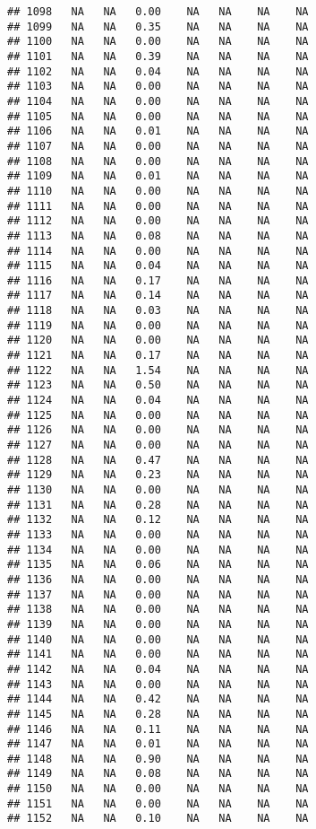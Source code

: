 \documentclass{article}\usepackage{graphicx, color}
\makeatletter
\newenvironment{kframe}{%
 \def\at@end@of@kframe{}%
 \ifinner\ifhmode%
  \def\at@end@of@kframe{\end{minipage}}%
  \begin{minipage}{\columnwidth}%
 \fi\fi%
 \def\FrameCommand##1{\hskip\@totalleftmargin \hskip-\fboxsep
 \colorbox{shadecolor}{##1}\hskip-\fboxsep
     \hskip-\linewidth \hskip-\@totalleftmargin \hskip\columnwidth}%
 \MakeFramed {\advance\hsize-\width
   \@totalleftmargin\z@ \linewidth\hsize
   \@setminipage}}%
 {\par\unskip\endMakeFramed%
 \at@end@of@kframe}
\newenvironment{knitrout}{}{} %
\makeatother
\begin{document}
\begin{knitrout}
\begin{kframe}
\begin{verbatim}
## 1098   NA   NA   0.00    NA   NA    NA    NA
## 1099   NA   NA   0.35    NA   NA    NA    NA
## 1100   NA   NA   0.00    NA   NA    NA    NA
## 1101   NA   NA   0.39    NA   NA    NA    NA
## 1102   NA   NA   0.04    NA   NA    NA    NA
## 1103   NA   NA   0.00    NA   NA    NA    NA
## 1104   NA   NA   0.00    NA   NA    NA    NA
## 1105   NA   NA   0.00    NA   NA    NA    NA
## 1106   NA   NA   0.01    NA   NA    NA    NA
## 1107   NA   NA   0.00    NA   NA    NA    NA
## 1108   NA   NA   0.00    NA   NA    NA    NA
## 1109   NA   NA   0.01    NA   NA    NA    NA
## 1110   NA   NA   0.00    NA   NA    NA    NA
## 1111   NA   NA   0.00    NA   NA    NA    NA
## 1112   NA   NA   0.00    NA   NA    NA    NA
## 1113   NA   NA   0.08    NA   NA    NA    NA
## 1114   NA   NA   0.00    NA   NA    NA    NA
## 1115   NA   NA   0.04    NA   NA    NA    NA
## 1116   NA   NA   0.17    NA   NA    NA    NA
## 1117   NA   NA   0.14    NA   NA    NA    NA
## 1118   NA   NA   0.03    NA   NA    NA    NA
## 1119   NA   NA   0.00    NA   NA    NA    NA
## 1120   NA   NA   0.00    NA   NA    NA    NA
## 1121   NA   NA   0.17    NA   NA    NA    NA
## 1122   NA   NA   1.54    NA   NA    NA    NA
## 1123   NA   NA   0.50    NA   NA    NA    NA
## 1124   NA   NA   0.04    NA   NA    NA    NA
## 1125   NA   NA   0.00    NA   NA    NA    NA
## 1126   NA   NA   0.00    NA   NA    NA    NA
## 1127   NA   NA   0.00    NA   NA    NA    NA
## 1128   NA   NA   0.47    NA   NA    NA    NA
## 1129   NA   NA   0.23    NA   NA    NA    NA
## 1130   NA   NA   0.00    NA   NA    NA    NA
## 1131   NA   NA   0.28    NA   NA    NA    NA
## 1132   NA   NA   0.12    NA   NA    NA    NA
## 1133   NA   NA   0.00    NA   NA    NA    NA
## 1134   NA   NA   0.00    NA   NA    NA    NA
## 1135   NA   NA   0.06    NA   NA    NA    NA
## 1136   NA   NA   0.00    NA   NA    NA    NA
## 1137   NA   NA   0.00    NA   NA    NA    NA
## 1138   NA   NA   0.00    NA   NA    NA    NA
## 1139   NA   NA   0.00    NA   NA    NA    NA
## 1140   NA   NA   0.00    NA   NA    NA    NA
## 1141   NA   NA   0.00    NA   NA    NA    NA
## 1142   NA   NA   0.04    NA   NA    NA    NA
## 1143   NA   NA   0.00    NA   NA    NA    NA
## 1144   NA   NA   0.42    NA   NA    NA    NA
## 1145   NA   NA   0.28    NA   NA    NA    NA
## 1146   NA   NA   0.11    NA   NA    NA    NA
## 1147   NA   NA   0.01    NA   NA    NA    NA
## 1148   NA   NA   0.90    NA   NA    NA    NA
## 1149   NA   NA   0.08    NA   NA    NA    NA
## 1150   NA   NA   0.00    NA   NA    NA    NA
## 1151   NA   NA   0.00    NA   NA    NA    NA
## 1152   NA   NA   0.10    NA   NA    NA    NA

\end{verbatim}
\end{kframe}
\end{knitrout}
\end{document}
